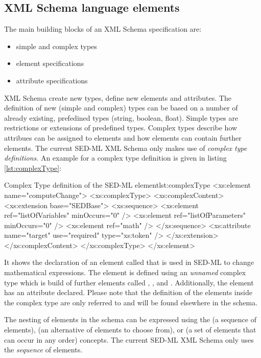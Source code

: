 \subsection{XML Schema language elements}
The main building blocks of an XML Schema specification are:
\begin{itemize}
\item {simple and complex types}
\item {element specifications}
\item {attribute specifications}
\end{itemize}
XML Schema  create new types,  define new elements and attributes.
The definition of new (simple and complex) types can be based on a number of already existing, prefedined types (string, boolean, float). Simple types are restrictions or extensions of predefined types. Complex types describe how attribues can be assigned to elements and how elements can contain further elements. The current SED-ML XML Schema only makes use of \emph{complex type definitions}.
An example for a complex type definition is given in listing \ref{lst:complexType}:
%
\begin{myXmlLst}{Complex Type definition of the SED-ML  element}{lst:complexType}
<xs:element name="computeChange">
		<xs:complexType>
			<xs:complexContent>
				<xs:extension base="SEDBase">
					<xs:sequence>
						<xs:element ref="listOfVariables" minOccurs="0" />
						<xs:element ref="listOfParameters" minOccurs="0" />
						<xs:element ref="math" />
					</xs:sequence>
					<xs:attribute name="target" use="required" type="xs:token" />
				</xs:extension>
			</xs:complexContent>
		</xs:complexType>
	</xs:element>
\end{myXmlLst}
%
It shows the declaration of an element called  that is used in SED-ML to change mathematical expressions. The element is defined using an \emph{unnamed} complex type which is build of further elements called , , and . 
Additionally, the element  has an attribute  declared. Please note that the definition of the elements inside the complex type are only referred to and will be found elsewhere in the schema.

The nesting of elements in the schema can be expressed using the  (a sequence of elements),  (an alternative of elements to choose from), or  (a set of elements that can occur in any order) concepts. The current SED-ML XML Schema only uses the \emph{sequence} of elements. 

